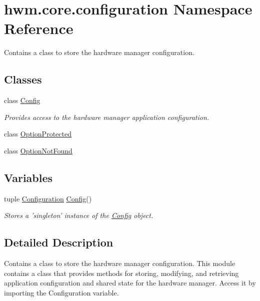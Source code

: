 \hypertarget{namespacehwm_1_1core_1_1configuration}{\section{hwm.\-core.\-configuration Namespace Reference}
\label{namespacehwm_1_1core_1_1configuration}
}


Contains a class to store the hardware manager configuration.  


\subsection*{Classes}
\begin{DoxyCompactItemize}
\item 
class \hyperlink{classhwm_1_1core_1_1configuration_1_1_config}{Config}
\begin{DoxyCompactList}\small\item\em Provides access to the hardware manager application configuration. \end{DoxyCompactList}\item 
class \hyperlink{classhwm_1_1core_1_1configuration_1_1_option_protected}{Option\-Protected}
\item 
class \hyperlink{classhwm_1_1core_1_1configuration_1_1_option_not_found}{Option\-Not\-Found}
\end{DoxyCompactItemize}
\subsection*{Variables}
\begin{DoxyCompactItemize}
\item 
tuple \hyperlink{namespacehwm_1_1core_1_1configuration_a87c77155d12f2ea9ccfb44c9602cb86a}{Configuration} \hyperlink{classhwm_1_1core_1_1configuration_1_1_config}{Config}()
\begin{DoxyCompactList}\small\item\em Stores a 'singleton' instance of the \hyperlink{classhwm_1_1core_1_1configuration_1_1_config}{Config} object. \end{DoxyCompactList}\end{DoxyCompactItemize}


\subsection{Detailed Description}
Contains a class to store the hardware manager configuration. This module contains a class that provides methods for storing, modifying, and retrieving application configuration and shared state for the hardware manager. Access it by importing the Configuration variable. 

